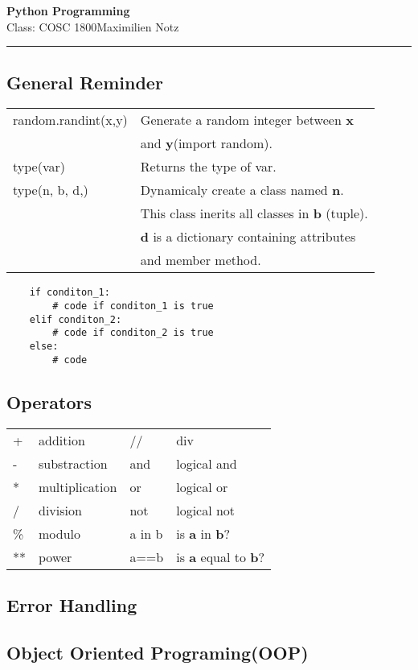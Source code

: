 \documentclass[5pt]{article}
\begin{document}
\begin{center}
     \Large{\textbf{Python Programming}}\\
     \small{Class: COSC 1800}\hfill\small{\textcopyright Maximilien Notz \the\year{}}
     \noindent\rule{20.2cm}{0.4pt}
\end{center}


\begin{multicols}{2}
\setcounter{secnumdepth}{0}

\subsection{General Reminder}
\begin{tabular}{ll}
    random.randint(x,y)     & Generate a random integer between \textbf{x}\\
                            & and \textbf{y}(import random).\\
    type(var)               & Returns the type of var.\\
    type(n, b, d,)          & Dynamicaly create a class named \textbf{n}.\\
                            & This class inerits all classes in \textbf{b} (tuple).\\
                            & \textbf{d} is a dictionary containing attributes\\
                            & and member method.\\
\end{tabular}
\begin{verbatim}
    if conditon_1:
        # code if conditon_1 is true
    elif conditon_2:
        # code if conditon_2 is true
    else:
        # code
\end{verbatim}


\subsection{Operators}
\begin{tabular}{|ll|ll|}
    \hline
    +   & addition & //  & div\\
    -   & substraction & and & logical and\\
    *   & multiplication & or  & logical or\\
    /   & division & not & logical not\\
    \%  & modulo & a in b  & is  \textbf{a} in  \textbf{b}?\\
    **  & power & a==b & is  \textbf{a} equal to  \textbf{b}? \\
    \hline
\end{tabular}



\subsection{Error Handling}

\subsection{Object Oriented Programing(OOP)}


\end{multicols}
\end{document}
